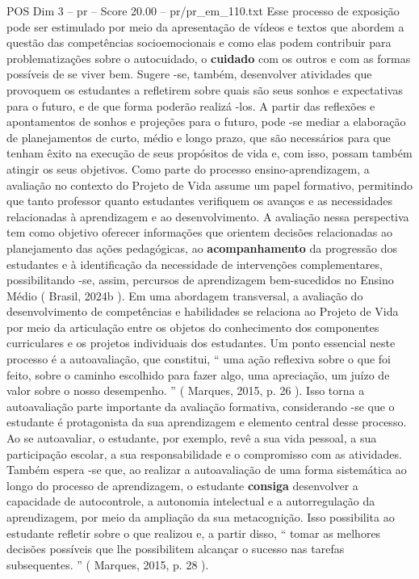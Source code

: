 \begin{textsample}{POS Dim 3 – pr – Score 20.00 – pr/pr\_em\_110.txt}
Esse processo de exposição pode ser estimulado por meio da apresentação de vídeos e textos que abordem a questão das competências socioemocionais e como elas podem contribuir para problematizações sobre o autocuidado, o \textbf{cuidado} com os outros e com as formas possíveis de se viver bem.
Sugere -se, também, desenvolver atividades que provoquem os estudantes a refletirem sobre quais são seus sonhos e expectativas para o futuro, e de que forma poderão realizá -los.
A partir das reflexões e apontamentos de sonhos e projeções para o futuro, pode -se mediar a elaboração de planejamentos de curto, médio e longo prazo, que são necessários para que tenham êxito na execução de seus propósitos de vida e, com isso, possam também atingir os seus objetivos.
Como parte do processo ensino-aprendizagem, a avaliação no contexto do Projeto de Vida assume um papel formativo, permitindo que tanto professor quanto estudantes verifiquem os avanços e as necessidades relacionadas à aprendizagem e ao desenvolvimento.
A avaliação nessa perspectiva tem como objetivo oferecer informações que orientem decisões relacionadas ao planejamento das ações pedagógicas, ao \textbf{acompanhamento} da progressão dos estudantes e à identificação da necessidade de intervenções complementares, possibilitando -se, assim, percursos de aprendizagem bem-sucedidos no Ensino Médio ( Brasil, 2024b ).
Em uma abordagem transversal, a avaliação do desenvolvimento de competências e habilidades se relaciona ao Projeto de Vida por meio da articulação entre os objetos do conhecimento dos componentes curriculares e os projetos individuais dos estudantes.
Um ponto essencial neste processo é a autoavaliação, que constitui, “ uma ação reflexiva sobre o que foi feito, sobre o caminho escolhido para fazer algo, uma apreciação, um juízo de valor sobre o nosso desempenho. ” ( Marques, 2015, p. 26 ).
Isso torna a autoavaliação parte importante da avaliação formativa, considerando -se que o estudante é protagonista da sua aprendizagem e elemento central desse processo.
Ao se autoavaliar, o estudante, por exemplo, revê a sua vida pessoal, a sua participação escolar, a sua responsabilidade e o compromisso com as atividades.
Também espera -se que, ao realizar a autoavaliação de uma forma sistemática ao longo do processo de aprendizagem, o estudante \textbf{consiga} desenvolver a capacidade de autocontrole, a autonomia intelectual e a autorregulação da aprendizagem, por meio da ampliação da sua metacognição.
Isso possibilita ao estudante refletir sobre o que realizou e, a partir disso, “ tomar as melhores decisões possíveis que lhe possibilitem alcançar o sucesso nas tarefas subsequentes. ” ( Marques, 2015, p. 28 ).

\end{textsample}
